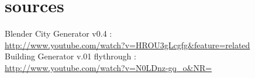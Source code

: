 \documentclass[a4paper,12pt]{article}
\begin{document}
\section*{sources}
Blender City Generator v0.4 :\\
\href{http://www.youtube.com/watch?v=HROU3gLcgfg&feature=related}{\url{http://www.youtube.com/watch?v=HROU3gLcgfg&feature=related}}\\

Building Generator v.01 flythrough :\\
\href{http://www.youtube.com/watch?v=N0LDnz-gq_o&NR=}{\url{http://www.youtube.com/watch?v=N0LDnz-gq_o&NR=}}\\
\end{document}
